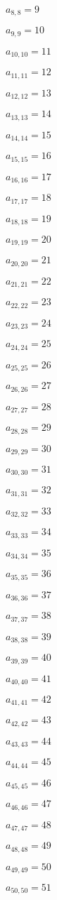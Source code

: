 \documentclass[a4paper,12pt]{article}
\begin{document}
$a _{ 8, 8 } = 9$

$a _{ 9, 9 } = 10$

$a _{ 10, 10 } = 11$

$a _{ 11, 11 } = 12$

$a _{ 12, 12 } = 13$

$a _{ 13, 13 } = 14$

$a _{ 14, 14 } = 15$

$a _{ 15, 15 } = 16$

$a _{ 16, 16 } = 17$

$a _{ 17, 17 } = 18$

$a _{ 18, 18 } = 19$

$a _{ 19, 19 } = 20$

$a _{ 20, 20 } = 21$

$a _{ 21, 21 } = 22$

$a _{ 22, 22 } = 23$

$a _{ 23, 23 } = 24$

$a _{ 24, 24 } = 25$

$a _{ 25, 25 } = 26$

$a _{ 26, 26 } = 27$

$a _{ 27, 27 } = 28$

$a _{ 28, 28 } = 29$

$a _{ 29, 29 } = 30$

$a _{ 30, 30 } = 31$

$a _{ 31, 31 } = 32$

$a _{ 32, 32 } = 33$

$a _{ 33, 33 } = 34$

$a _{ 34, 34 } = 35$

$a _{ 35, 35 } = 36$

$a _{ 36, 36 } = 37$

$a _{ 37, 37 } = 38$

$a _{ 38, 38 } = 39$

$a _{ 39, 39 } = 40$

$a _{ 40, 40 } = 41$

$a _{ 41, 41 } = 42$

$a _{ 42, 42 } = 43$

$a _{ 43, 43 } = 44$

$a _{ 44, 44 } = 45$

$a _{ 45, 45 } = 46$

$a _{ 46, 46 } = 47$

$a _{ 47, 47 } = 48$

$a _{ 48, 48 } = 49$

$a _{ 49, 49 } = 50$

$a _{ 50, 50 } = 51$
\end{document}
